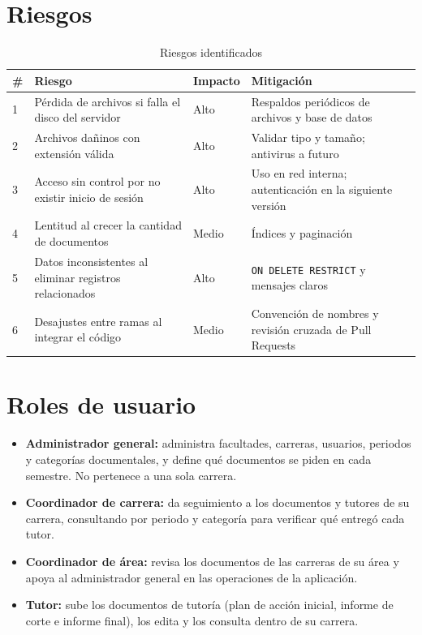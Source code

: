 \documentclass[12pt,a4paper,oneside]{article}
\begin{document}
\section{Riesgos}
\begin{table}[H]\centering
\caption{Riesgos identificados}
\small\renewcommand{\arraystretch}{1.3}
\begin{tabularx}{\linewidth}{@{}p{0.6cm}X p{1.8cm} X@{}}
\toprule
\# & Riesgo & Impacto & Mitigación\\ \midrule
1 & Pérdida de archivos si falla el disco del servidor & Alto & Respaldos periódicos de archivos y base de datos\\
2 & Archivos dañinos con extensión válida & Alto & Validar tipo y tamaño; antivirus a futuro\\
3 & Acceso sin control por no existir inicio de sesión & Alto & Uso en red interna; autenticación en la siguiente versión\\
4 & Lentitud al crecer la cantidad de documentos & Medio & Índices y paginación\\
5 & Datos inconsistentes al eliminar registros relacionados & Alto & \texttt{ON DELETE RESTRICT} y mensajes claros\\
6 & Desajustes entre ramas al integrar el código & Medio & Convención de nombres y revisión cruzada de Pull Requests\\
\bottomrule
\end{tabularx}
\end{table}

\section{Roles de usuario}
\begin{itemize}[leftmargin=1.8em,itemsep=3pt]
\item \textbf{Administrador general:} administra facultades, carreras, usuarios, periodos y categorías documentales, y define qué documentos se piden en cada semestre. No pertenece a una sola carrera.
\item \textbf{Coordinador de carrera:} da seguimiento a los documentos y tutores de su carrera, consultando por periodo y categoría para verificar qué entregó cada tutor.
\item \textbf{Coordinador de área:} revisa los documentos de las carreras de su área y apoya al administrador general en las operaciones de la aplicación.
\item \textbf{Tutor:} sube los documentos de tutoría (plan de acción inicial, informe de corte e informe final), los edita y los consulta dentro de su carrera.
\end{itemize}
\end{document}
